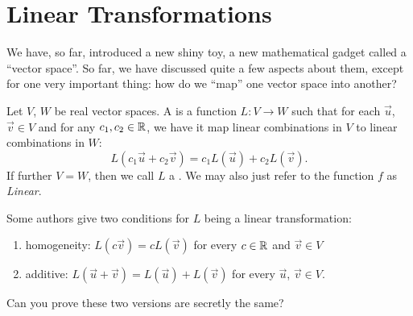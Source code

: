 \section{Linear Transformations}

\M
We have, so far, introduced a new shiny toy, a new mathematical gadget
called a ``vector space''. So far, we have discussed quite a few aspects
about them, except for one very important thing: how do we ``map'' one
vector space into another?

\begin{definition}
Let $V$, $W$ be real vector spaces.
A  is a function $L\colon V\to W$ such
that for each $\vec{u}$, $\vec{v}\in V$ and for any $c_{1},c_{2}\in\mathbb{R}$,
we have it map linear combinations in $V$ to linear combinations in $W$:
\begin{equation}
L(c_{1}\vec{u} + c_{2}\vec{v}) = c_{1}L(\vec{u}) + c_{2}L(\vec{v}).
\end{equation}
If further $V=W$, then we call $L$ a .
We may also just refer to the function $f$ as \emph{Linear}.
\end{definition}

\begin{remark}
  Some authors give two conditions for $L$ being a linear transformation:
  \begin{enumerate}
  \item homogeneity: $L(c\vec{v})=cL(\vec{v})$ for every $c\in\mathbb{R}$ and
    $\vec{v}\in V$
  \item additive: $L(\vec{u}+\vec{v})=L(\vec{u})+L(\vec{v})$ for every
    $\vec{u}$, $\vec{v}\in V$.
  \end{enumerate}
  Can you prove these two versions are secretly the same?
\end{remark}

